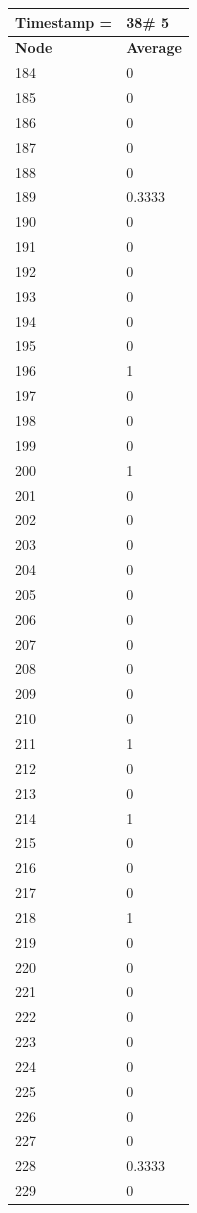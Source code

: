 \begin{tabular}{|l||l|}
\hline
\textbf{Timestamp =} & \textbf{38}\# 5\\\hline
	\textbf{Node} & \textbf{Average} \\ \hline
\hline
	184 & 0 \\ \hline
	185 & 0 \\ \hline
	186 & 0 \\ \hline
	187 & 0 \\ \hline
	188 & 0 \\ \hline
	189 & 0.3333 \\ \hline
	190 & 0 \\ \hline
	191 & 0 \\ \hline
	192 & 0 \\ \hline
	193 & 0 \\ \hline
	194 & 0 \\ \hline
	195 & 0 \\ \hline
	196 & 1 \\ \hline
	197 & 0 \\ \hline
	198 & 0 \\ \hline
	199 & 0 \\ \hline
	200 & 1 \\ \hline
	201 & 0 \\ \hline
	202 & 0 \\ \hline
	203 & 0 \\ \hline
	204 & 0 \\ \hline
	205 & 0 \\ \hline
	206 & 0 \\ \hline
	207 & 0 \\ \hline
	208 & 0 \\ \hline
	209 & 0 \\ \hline
	210 & 0 \\ \hline
	211 & 1 \\ \hline
	212 & 0 \\ \hline
	213 & 0 \\ \hline
	214 & 1 \\ \hline
	215 & 0 \\ \hline
	216 & 0 \\ \hline
	217 & 0 \\ \hline
	218 & 1 \\ \hline
	219 & 0 \\ \hline
	220 & 0 \\ \hline
	221 & 0 \\ \hline
	222 & 0 \\ \hline
	223 & 0 \\ \hline
	224 & 0 \\ \hline
	225 & 0 \\ \hline
	226 & 0 \\ \hline
	227 & 0 \\ \hline
	228 & 0.3333 \\ \hline
	229 & 0 \\ \hline
\end{tabular}

